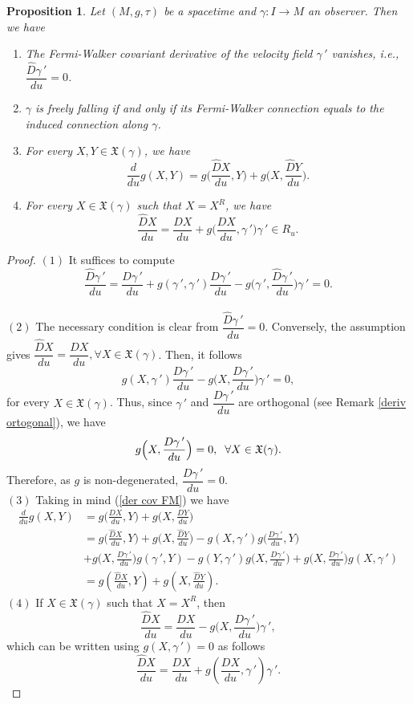 \documentclass[11pt]{book}
\newtheorem{pro}[defi]{Proposition}
\def\x{\mathfrak X}
\begin{document}
\begin{pro}\label{propiedades de FM}
	Let $(M,g,\tau)$ be a spacetime and $\gamma:I\to M$ an observer. Then we have
	\begin{enumerate}
		\item[(1)] The Fermi-Walker covariant derivative of the velocity field $\gamma{\,'}$ vanishes, i.e., $\dfrac{\widehat{D}\gamma{\,'}}{du}=0$.
		
		\item[(2)] $\gamma$ is freely falling if and only if its Fermi-Walker connection equals to the induced connection along $\gamma$.
		
		\item[(3)]\label{FM prop 4} For every $X,Y\in \x(\gamma)$, we have $$\dfrac{d}{du}g(X,Y)=g\Big(\dfrac{\widehat{D}X}{du},Y\Big)+g\Big(X,\dfrac{\widehat{D}Y}{du}\Big).$$
		
		\item[(4)] For every $X\in \x(\gamma)$ such that $X=X^R$, we have
		$$\dfrac{\widehat{D}X}{du}=\dfrac{DX}{du}+g\Big(\dfrac{DX}{du},\gamma{\,'}\Big)\gamma{\,'}\in R_u.$$
	\end{enumerate}
\end{pro}
\begin{proof}
	$(1)$ It suffices to compute
	\[
	\frac{\widehat{D}\gamma{\,'}}{du}=\frac{D\gamma{\,'}}{du}+g(\gamma{\,'},\gamma{\,'})\frac{D\gamma{\,'}}{du}-g\Big(\gamma{\,'},\frac{\widehat{D}\gamma{\,'}}{du}\Big)\gamma{\,'}=0.
	\]
	\\	
	$(2)$ The necessary condition is clear from $\dfrac{\widehat{D}\gamma{\,'}}{du}=0$. Conversely, 
	the assumption gives $\dfrac{\widehat{D}X}{du}=\dfrac{DX}{du},\forall X\in\x(\gamma)$. Then, it follows
	\[
	g(X,\gamma{\,'})\frac{D\gamma{\,'}}{du}-g\Big(X,\frac{D\gamma{\,'}}{du}\Big)\gamma{\,'}=0,
	\]
	for every $X\in \x(\gamma)$. Thus, since $\gamma{\,'}$ and $\dfrac{D\gamma{\,'}}{du}$ are orthogonal (see Remark \ref{deriv ortogonal}), we have
	\[
	g\Big(X,\frac{D\gamma{\,'}}{du}\Big)=0,\hspace{2mm}\forall X\in\x(\gamma).
	\]
	Therefore, as $g$ is non-degenerated, $\dfrac{D\gamma{\,'}}{du}=0$.
	\\
	$(3)$ Taking in mind (\ref{der cov FM}) we have
	\begin{align*}
	\frac{d}{du} g(X,Y) & = g\Big(\frac{DX}{du},Y\Big)+ g\Big(X,\frac{DY}{du}\Big) \\[2mm]
	& = g\Big(\frac{\widehat{D}X}{du},Y\Big)+ g\Big(X,\frac{\widehat{D}Y}{du}\Big) -g(X,\gamma{\,'})g\Big(\frac{D\gamma{\,'}}{du},Y\Big) \\[2mm]
	&+g\Big(X,\frac{D\gamma{\,'}}{du}\Big)g(\gamma{\,'},Y)-g(Y,\gamma{\,'})g\Big(X,\frac{D\gamma{\,'}}{du}\Big)+g\Big(X,\frac{D\gamma{\,'}}{du}\Big)g(X,\gamma{\,'})\\[2mm]
	& = g\left(\frac{\widehat{D}X}{du},Y\right)+ g\left(X,\frac{\widehat{D}Y}{du}\right).
	\end{align*}
	$(4)$ If $X\in \x(\gamma)$ such that $X=X^R$, then
	\[
	\frac{\widehat{D}X}{du}=\frac{DX}{du}-g\Big(X,\frac{D\gamma{\,'}}{du}\Big)\gamma{\,'},
	\]
	which can be written using $g(X,\gamma{\,'})=0$ as follows
	\[
	\frac{\widehat{D}X}{du}=\frac{DX}{du}+g\left(\frac{DX}{du},\gamma{\,'}\right)\gamma{\,'}.
	\]
\end{proof}
\end{document}

